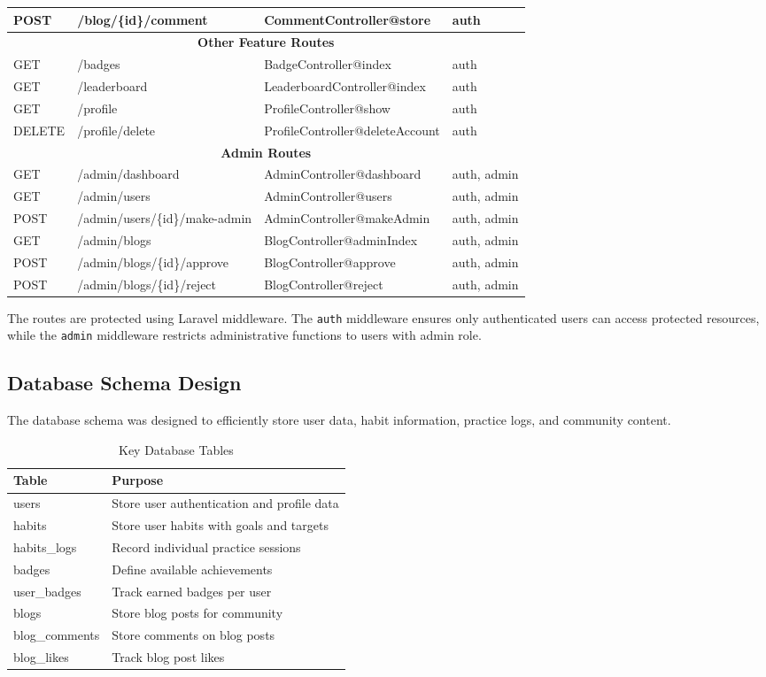 \documentclass[12pt,a4paper]{report}
\newcommand{\JustifiedNormal}{\fontsize{12}{14}\selectfont\justifying\setlength{\parindent}{0pt}}
\begin{document}
\begin{longtable}{|p{1.5cm}|p{4.5cm}|p{4.5cm}|p{2.5cm}|}
POST & /blog/\{id\}/comment & CommentController@store & auth \\
\hline
\multicolumn{4}{|c|}{\textbf{Other Feature Routes}} \\
\hline
GET & /badges & BadgeController@index & auth \\
GET & /leaderboard & LeaderboardController@index & auth \\
GET & /profile & ProfileController@show & auth \\
DELETE & /profile/delete & ProfileController@deleteAccount & auth \\
\hline
\multicolumn{4}{|c|}{\textbf{Admin Routes}} \\
\hline
GET & /admin/dashboard & AdminController@dashboard & auth, admin \\
GET & /admin/users & AdminController@users & auth, admin \\
POST & /admin/users/\{id\}/make-admin & AdminController@makeAdmin & auth, admin \\
GET & /admin/blogs & BlogController@adminIndex & auth, admin \\
POST & /admin/blogs/\{id\}/approve & BlogController@approve & auth, admin \\
POST & /admin/blogs/\{id\}/reject & BlogController@reject & auth, admin \\
\hline
\end{longtable}

\JustifiedNormal
The routes are protected using Laravel middleware. The \texttt{auth} middleware ensures only authenticated users can access protected resources, while the \texttt{admin} middleware restricts administrative functions to users with admin role.

\subsection{Database Schema Design}
\JustifiedNormal
The database schema was designed to efficiently store user data, habit information, practice logs, and community content.

\begin{table}[H]
\centering
\caption{Key Database Tables}
\begin{tabular}{|l|p{8cm}|}
\hline
\textbf{Table} & \textbf{Purpose} \\
\hline
users & Store user authentication and profile data \\
habits & Store user habits with goals and targets \\
habits\_logs & Record individual practice sessions \\
badges & Define available achievements \\
user\_badges & Track earned badges per user \\
blogs & Store blog posts for community \\
blog\_comments & Store comments on blog posts \\
blog\_likes & Track blog post likes \\
\hline
\end{tabular}
\end{table}
\end{document}
